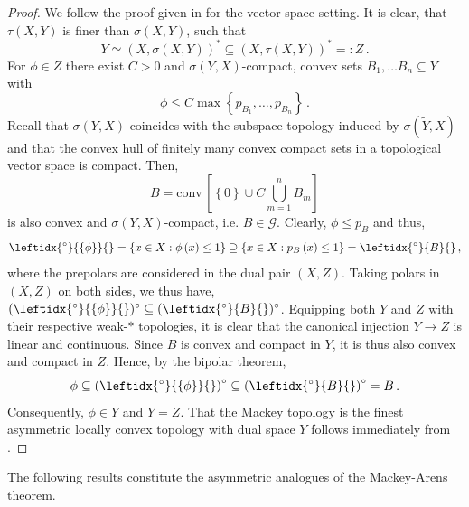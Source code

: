 \documentclass[
	paper=A4,
	pagesize=auto,
	fontsize=12pt
]{scrartcl}
\theoremstyle{plain}
\theoremstyle{remark}
\theoremstyle{definition}
\begin{document}
\begin{proof}
We follow the proof given in \cite[p. 131, Theorem 3.2]{src:SchaeferWolff:TVS} for the vector space setting.
It is clear, that $\tau(X,Y)$ is finer than $\sigma(X,Y)$, such that
%
\begin{equation}
Y \simeq (X, \sigma(X, Y))^* \subseteq (X, \tau(X, Y))^* =: Z \, .
\end{equation}
%
For $\phi \in Z$ there exist $C > 0$ and $\sigma(Y,X)$-compact, convex sets $B_1, \dots B_n \subseteq Y$ \cite[Proposition 2.1.11]{src:Cobzaş:FunctionalAnalysisinAsymmetricNormedSpaces} with
%
\begin{equation}
\phi
\le
C \max \left\{ p_{B_1}, \dots, p_{B_n} \right\} \, .
\end{equation}
%
Recall that $\sigma(Y, X)$ coincides with the subspace topology induced by $\sigma(\widetilde{Y}, X)$ and that the convex hull of finitely many convex compact sets in a topological vector space is compact.
Then,
%
\begin{equation}
B = \mathrm{conv}\, \left[ \left\{ 0 \right\} \cup C \bigcup_{m = 1}^n B_m \right]
\end{equation}
%
is also convex and $\sigma(Y, X)$-compact, i.e. $B \in \mathcal{G}$.
Clearly, $\phi \le p_B$ and thus,
%
\begin{equation}
\leftidx{^\circ}{\left\{ \phi \right\}}{}
=
\left\{ x \in X : \phi \left( x \right) \le 1 \right\}
\supseteq
\left\{ x \in X : p_B \left( x \right) \le 1 \right\}
=
\leftidx{^\circ}{B}{} \, ,
\end{equation}
%
where the prepolars are considered in the dual pair $(X, Z)$.
Taking polars in $(X, Z)$ on both sides, we thus have, $( \leftidx{^\circ}{\{ \phi \}}{} )^\circ \subseteq ( \leftidx{^\circ}{B}{} )^\circ$.
Equipping both $Y$ and $Z$ with their respective weak-$\ast$ topologies, it is clear that the canonical injection $Y \to Z$ is linear and continuous.
Since $B$ is convex and compact in $Y$, it is thus also convex and compact in $Z$.
Hence, by the bipolar theorem,
%
\begin{equation}
\phi \subseteq \left( \leftidx{^\circ}{\left\{ \phi \right\}}{} \right)^\circ \subseteq \left( \leftidx{^\circ}{B}{} \right)^\circ = B \, .
\end{equation}
%
Consequently, $\phi \in Y$ and $Y = Z$.
That the Mackey topology is the finest asymmetric locally convex topology with dual space $Y$ follows immediately from .
\end{proof}
%
The following results constitute the asymmetric analogues of the Mackey-Arens theorem.
\end{document}
